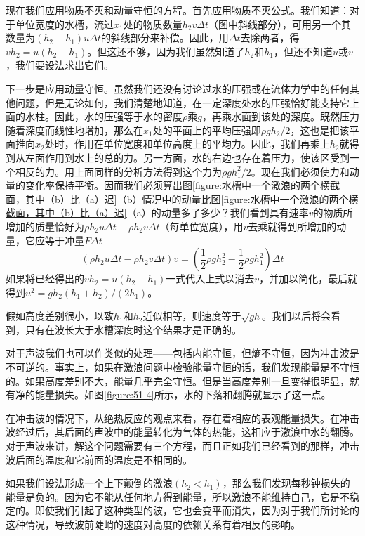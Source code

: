 现在我们应用物质不灭和动量守恒的方程。首先应用物质不灭公式。我们知道：对于单位宽度的水槽，流过$x_1$处的物质数量$h_2 v \Delta t$（图中斜线部分），可用另一个其数量为$(h_2 -h_1)u \Delta t$的斜线部分来补偿。因此，用$\Delta t$去除两者，得$vh_2 =u(h_2 -h_1)$。但这还不够，因为我们虽然知道了$h_2$和$h_1$，但还不知道$u$或$v$，我们要设法求出它们。

下一步是应用动量守恒。虽然我们还没有讨论过水的压强或在流体力学中的任何其他问题，但是无论如何，我们清楚地知道，在一定深度处水的压强恰好能支持它上面的水柱。因此，水的压强等于水的密度$\rho$乘$g$，再乘水面到该处的深度。既然压力随着深度而线性地增加，那么在$x_1$处的平面上的平均压强即$\rho gh_2 /2$，这也是把该平面推向$x_2$处时，作用在单位宽度和单位高度上的平均力。因此，我们再乘上$h_2$就得到从左面作用到水上的总的力。另一方面，水的右边也存在着压力，使该区受到一个相反的力。用上面同样的分析方法得到这个力为$\rho gh_1^2 /2$。现在我们必须使力和动量的变化率保持平衡。因而我们必须算出图\ref{figure:水槽中一个激浪的两个横截面，其中（b）比（a）迟}（b）情况中的动量比图\ref{figure:水槽中一个激浪的两个横截面，其中（b）比（a）迟}（a）的动量多了多少？我们看到具有速率$v$的物质所增加的质量恰好为$\rho h_2 u \Delta t -\rho h_2 v \Delta t$（每单位宽度），用$v$去乘就得到所增加的动量，它应等于冲量$F \Delta t$
\begin{equation*}
    (\rho h_2u\Delta t-\rho h_2v\Delta t)v=\left(\frac12\rho gh_2^2-\frac12\rho gh_1^2\right)\Delta t
\end{equation*}
如果将已经得出的$vh_2 =u(h_2 -h_1)$一式代入上式以消去$v$，并加以简化，最后就得到$u^2 =gh_2(h_1 +h_2)/(2h_1)$。

假如高度差别很小，以致$h_1$和$h_2$近似相等，则速度等于$\sqrt{gh}$。我们以后将会看到，只有在波长大于水槽深度时这个结果才是正确的。

对于声波我们也可以作类似的处理——包括内能守恒，但熵不守恒，因为冲击波是不可逆的。事实上，如果在激浪问题中检验能量守恒的话，我们发现能量是不守恒的。如果高度差别不大，能量几乎完全守恒。但是当高度差别一旦变得很明显，就有净的能量损失。如图\ref{figure:51-4}所示，水的下落和翻腾就显示了这一点。

在冲击波的情况下，从绝热反应的观点来看，存在着相应的表观能量损失。在冲击波经过后，其后面的声波中的能量转化为气体的热能，这相应于激浪中水的翻腾。对于声波来讲，解这个问题需要有三个方程，而且正如我们已经看到的那样，冲击波后面的温度和它前面的温度是不相同的。

如果我们设法形成一个上下颠倒的激浪$(h_2 <h_1)$，那么我们发现每秒钟损失的能量是负的。因为它不能从任何地方得到能量，所以激浪不能维持自己，它是不稳定的。即使我们引起了这种类型的波，它也会变平而消失，因为对于我们所讨论的这种情况，导致波前陡峭的速度对高度的依赖关系有着相反的影响。

